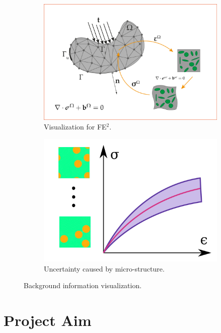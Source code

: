 \documentclass[11pt, english] {article}
\begin{document}
\begin{figure}
\centering
\begin{subfigure}{0.45\textwidth}
    \includegraphics[width=\textwidth]{multiscale}
    \caption{Visualization for FE$^2$.}
    \label{fig:fe2}
\end{subfigure}%
\begin{subfigure}{0.45\textwidth}
    \includegraphics[width=\textwidth]{yuko_aicapstone}
    \caption{Uncertainty caused by micro-structure.}
    \label{fig:uq}
\end{subfigure}
\caption{Background information visualization.}
\label{fig:figures}
\end{figure}

\section{Project Aim}
\end{document}
